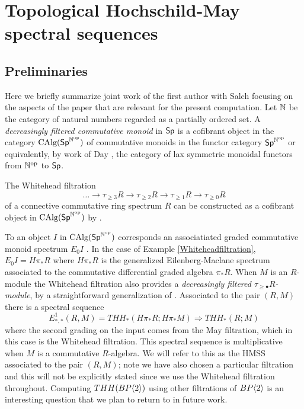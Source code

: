 \section{Topological Hochschild-May spectral sequences}
\subsection{Preliminaries}
Here we briefly summarize joint work of the first author with Salch \cite{THH-May} focusing on the aspects of the paper that are relevant for the present computation. Let $\mathbb{N}$ be the category of natural numbers regarded as a partially ordered set. A \emph{decreasingly filtered commutative monoid} in $\mathsf{Sp}$ is a cofibrant object in the category $\rm CAlg(\mathsf{Sp}^{\mathbb{N}^{\mathrm{op}}})$ of commutative monoids in the functor category $\mathsf{Sp}^{\mathbb{N}^{\mathrm{op}}}$ or equivalently, by work of  Day \cite{Day}, the category of lax symmetric monoidal functors from $\mathbb{N}^{\mathrm{op}}$ to $\mathsf{Sp}$. 
\begin{ex}\label{Whiteheadfiltration}
The Whitehead filtration 
\[ \dots \longrightarrow \tau_{\ge 3} R\longrightarrow \tau_{\ge 2} R\longrightarrow \tau_{\ge 1} R \longrightarrow \tau_{\ge 0} R\]
of a connective commutative ring spectrum $R$ can be constructed as a cofibrant object in $\rm CAlg(\mathsf{Sp}^{\mathbb{N}^{\mathrm{op}}})$ by \cite[Thm. 4.2.1]{THH-May}. 
\end{ex}
To an object $I$ in $\rm CAlg(\mathsf{Sp}^{\mathbb{N}^{\mathrm{op}}})$ corresponds an associatiated graded commutative monoid spectrum $E_0I$ \cite[Def. 3.1.6]{THH-May}. In the case of Example \ref{Whiteheadfiltration}, $E_0I=H\pi_*R$ where $H\pi_*R$ is the generalized Eilenberg-Maclane spectrum associated to the commutative differential graded algebra $\pi_*R$. When $M$ is an $R$-module the Whitehead filtration also provides a \emph{decreasingly filtered $\tau_{\ge \bullet}R$-module}, by a straightforward generalization of \cite[Thm. 4.2.1]{THH-May}. Associated to the pair $(R,M)$ there is a spectral sequence
\begin{equation}\label{HMSS} E^1_{*,*}(R,M)=THH_*(H\pi_*R;H\pi_*M)\Rightarrow THH_*(R;M)\end{equation}
where the second grading on the input comes from the May filtration, which in this case is the Whitehead filtration. This spectral sequence is multiplicative when $M$ is a commutative $R$-algebra. We will refer to this as the HMSS associated to the pair $(R,M)$; note we have also chosen a particular filtration and this will not be explicitly stated since we use the Whitehead filtration throughout. Computing $THH(BP\langle 2 \rangle)$ using other filtrations of $BP\langle 2 \rangle$ is an interesting question that we plan to return to in future work. 

